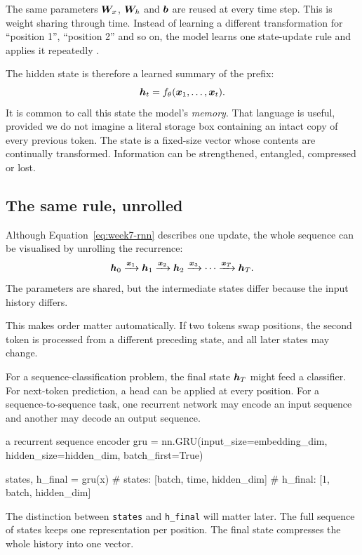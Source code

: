 The same parameters \(\bm{W}_x\), \(\bm{W}_h\) and \(\bm{b}\) are reused at every time step. This is weight sharing through time. Instead of learning a different transformation for ``position 1'', ``position 2'' and so on, the model learns one state-update rule and applies it repeatedly \parencite{elman1990}.

The hidden state is therefore a learned summary of the prefix:
\[
  \bm{h}_t = f_\theta(\bm{x}_1,\ldots,\bm{x}_t).
\]
It is common to call this state the model's \emph{memory}. That language is useful, provided we do not imagine a literal storage box containing an intact copy of every previous token. The state is a fixed-size vector whose contents are continually transformed. Information can be strengthened, entangled, compressed or lost.

\subsection{The same rule, unrolled}

Although Equation~\eqref{eq:week7-rnn} describes one update, the whole sequence can be visualised by unrolling the recurrence:
\[
  \bm{h}_0
  \xrightarrow{\bm{x}_1}
  \bm{h}_1
  \xrightarrow{\bm{x}_2}
  \bm{h}_2
  \xrightarrow{\bm{x}_3}
  \cdots
  \xrightarrow{\bm{x}_T}
  \bm{h}_T.
\]
The parameters are shared, but the intermediate states differ because the input history differs.

This makes order matter automatically. If two tokens swap positions, the second token is processed from a different preceding state, and all later states may change.

For a sequence-classification problem, the final state \(\bm{h}_T\) might feed a classifier. For next-token prediction, a head can be applied at every position. For a sequence-to-sequence task, one recurrent network may encode an input sequence and another may decode an output sequence.

\begin{pytorchbox}{a recurrent sequence encoder}
gru = nn.GRU(input_size=embedding_dim,
             hidden_size=hidden_dim,
             batch_first=True)

states, h_final = gru(x)
# states: [batch, time, hidden_dim]
# h_final: [1, batch, hidden_dim]
\end{pytorchbox}

The distinction between \texttt{states} and \texttt{h\_final} will matter later. The full sequence of states keeps one representation per position. The final state compresses the whole history into one vector.

